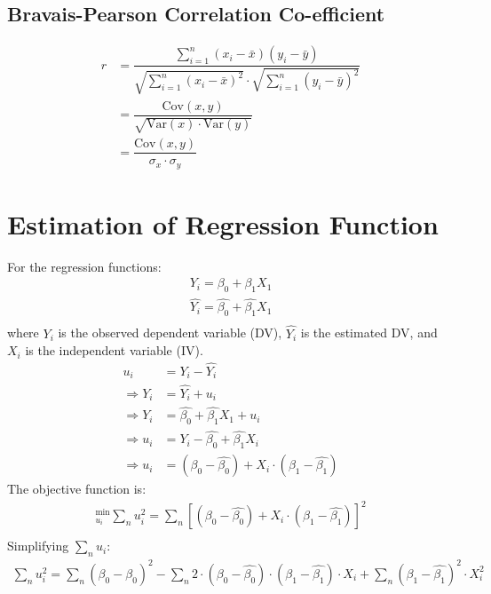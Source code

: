 \documentclass[openany,b5paper]{article}
\begin{document}
\subsection{Bravais-Pearson Correlation Co-efficient}
\begin{align}
r &= \dfrac{\sum_{i=1}^n (x_i-\bar{x})(y_i-\bar{y})}{\sqrt{\sum_{i=1}^n (x_i-\bar{x})^2} \cdot \sqrt{\sum_{i=1}^n (y_i -\bar{y})^2}}\\
& = \dfrac{\text{Cov}(x,y)}{\sqrt{\text{Var}(x) \cdot \text{Var}(y)}}\\
& = \dfrac{\text{Cov}(x,y)}{\sigma_x \cdot \sigma_y}
\end{align}

\section{Estimation of Regression Function}
For the regression functions:
\begin{align}
	Y_i = \beta_0 + \beta_1 X_1\\
	\hat{Y_i} = \hat{\beta_0} + \hat{\beta_1} X_1\\
\end{align}
where $Y_i$ is the observed dependent variable (DV), $\hat{Y_i}$ is the estimated DV, and $X_i$ is the independent variable (IV).
\begin{align}
	u_i &= Y_i - \hat{Y_i}\\
	\Rightarrow Y_i &= \hat{Y_i} + u_i\\
	\Rightarrow Y_i &= \hat{\beta_0} + \hat{\beta_1} X_1 + u_i\\
	\Rightarrow u_i &= Y_i - \hat{\beta_0} + \hat{\beta_1} X_i\\
	\Rightarrow u_i &= \left(\beta_0 - \hat{\beta_0}\right) + X_i \cdot \left( \beta_1 - \hat{\beta_1} \right)
\end{align}
The objective function is:
\begin{align*}
	^{\text{min}}_{u_i} \sum_n u_i^2 = \sum_n \left[\left(\beta_0 - \hat{\beta_0}\right) + X_i \cdot \left( \beta_1 - \hat{\beta_1} \right)\right]^2\\
\end{align*}
Simplifying $\sum_n u_i$:
\begin{align*}
	\sum_n u_i^2 = \sum_n (\beta_0 - \hat{\beta_0})^2 - \sum_n 2 \cdot (\beta_0 - \hat{\beta_0}) \cdot (\beta_1 - \hat{\beta_1}) \cdot X_i + \sum_n (\beta_1 - \hat{\beta_1})^2 \cdot X_i^2
\end{align*}
\end{document}
